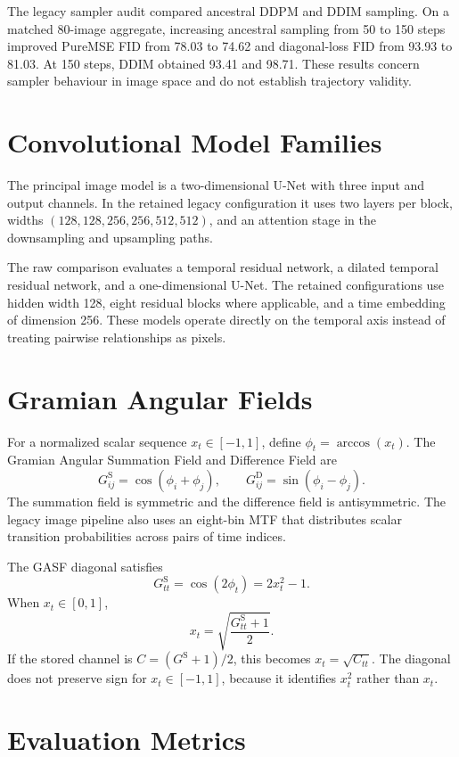 \documentclass[12pt,a4paper,oneside]{report}
\begin{document}
The legacy sampler audit compared ancestral DDPM and DDIM sampling. On a matched 80-image aggregate, increasing ancestral sampling from 50 to 150 steps improved PureMSE FID from 78.03 to 74.62 and diagonal-loss FID from 93.93 to 81.03. At 150 steps, DDIM obtained 93.41 and 98.71. These results concern sampler behaviour in image space and do not establish trajectory validity.

\section{Convolutional Model Families}

The principal image model is a two-dimensional U-Net with three input and output channels. In the retained legacy configuration it uses two layers per block, widths $(128,128,256,256,512,512)$, and an attention stage in the downsampling and upsampling paths.

The raw comparison evaluates a temporal residual network, a dilated temporal residual network, and a one-dimensional U-Net. The retained configurations use hidden width 128, eight residual blocks where applicable, and a time embedding of dimension 256. These models operate directly on the temporal axis instead of treating pairwise relationships as pixels.

\section{Gramian Angular Fields}

For a normalized scalar sequence $x_t\in[-1,1]$, define $\phi_t=\arccos(x_t)$. The Gramian Angular Summation Field and Difference Field are
\[
G^{\mathrm{S}}_{ij}=\cos(\phi_i+\phi_j),
\qquad
G^{\mathrm{D}}_{ij}=\sin(\phi_i-\phi_j).
\]
The summation field is symmetric and the difference field is antisymmetric. The legacy image pipeline also uses an eight-bin MTF that distributes scalar transition probabilities across pairs of time indices.

The GASF diagonal satisfies
\[
G^{\mathrm{S}}_{tt}=\cos(2\phi_t)=2x_t^2-1.
\]
When $x_t\in[0,1]$,
\[
x_t=\sqrt{\frac{G^{\mathrm{S}}_{tt}+1}{2}}.
\]
If the stored channel is $C=(G^{\mathrm{S}}+1)/2$, this becomes $x_t=\sqrt{C_{tt}}$. The diagonal does not preserve sign for $x_t\in[-1,1]$, because it identifies $x_t^2$ rather than $x_t$.

\section{Evaluation Metrics}
\end{document}
